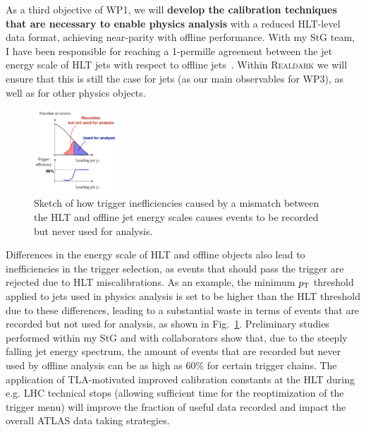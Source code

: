 As a third objective of WP1, we will \textbf{develop the calibration techniques that are necessary to enable physics analysis} with a reduced HLT-level data format, achieving near-parity with offline performance. 
With my StG team, I have been responsible for reaching a 1-permille agreement between the jet energy scale of HLT jets with respect to offline jets~\cite{ToBeCited}.%
Within \textsc{Realdark} we will ensure that this is still the case for jets (as our main observables for WP3), as well as for other physics objects. 
\begin{figure} 
\begin{center}
\includegraphics[width=0.28\textwidth]{figs_B2/efficiencySketch}
\caption{\color{black}\label{fig:wastedRate} \small Sketch of how trigger inefficiencies caused by a mismatch between the HLT and offline jet energy scales causes events to be recorded but never used for analysis.} %
\vskip2pt
\end{center}
\end{figure}
Differences in the energy scale of HLT and offline objects also lead to inefficiencies in the trigger selection, as events that should pass the trigger are rejected due to HLT miscalibrations. 
As an example, the minimum $p_{\rm{T}}$ threshold applied to jets used in physics analysis is set to be higher than the HLT threshold due to these differences, leading to a substantial waste in terms of events that are recorded but not used for analysis, as shown in Fig.~\ref{fig:wastedRate}. 
Preliminary studies performed within my StG and with collaborators show that, due to the steeply falling jet energy spectrum, the amount of events that are recorded but never used by offline analysis can be as high as 60\% for certain trigger chains. 
The application of TLA-motivated improved calibration constants at the HLT during e.g. LHC technical stops (allowing sufficient time for the reoptimization of the trigger menu) will improve the fraction of useful data recorded and impact the overall ATLAS data taking strategies. 

